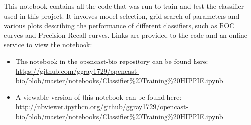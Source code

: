 This notebook contains all the code that was run to train and test the classifier used in this project.
It involves model selection, grid search of parameters and various plots describing the performance of different classifiers, such as ROC curves and Precision Recall curves.
Links are provided to the code and an online service to view the notebook:

\begin{itemize}
    \item The notebook in the opencast-bio repository can be found here: \url{https://github.com/ggray1729/opencast-bio/blob/master/notebooks/Classifier%20Training%20HIPPIE.ipynb}
    \item A viewable version of this notebook can be found here: \url{http://nbviewer.ipython.org/github/ggray1729/opencast-bio/blob/master/notebooks/Classifier%20Training%20HIPPIE.ipynb}
\end{itemize}





